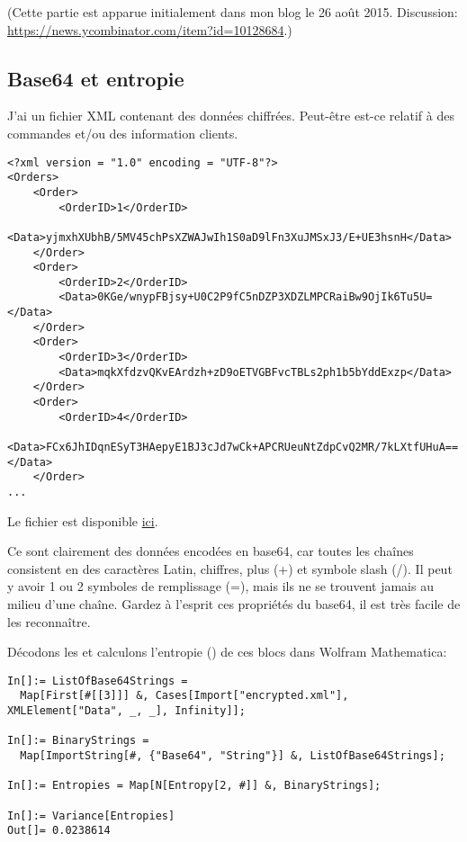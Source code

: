 \label{encrypted_DB1}

(Cette partie est apparue initialement dans mon blog le 26 août 2015.
Discussion: \url{https://news.ycombinator.com/item?id=10128684}.)

\subsection{Base64 et entropie}

J'ai un fichier \ac{XML} contenant des données chiffrées.
Peut-être est-ce relatif à des commandes et/ou des information clients.

\begin{lstlisting}
<?xml version = "1.0" encoding = "UTF-8"?>
<Orders>
	<Order>
		<OrderID>1</OrderID>
		<Data>yjmxhXUbhB/5MV45chPsXZWAJwIh1S0aD9lFn3XuJMSxJ3/E+UE3hsnH</Data>
	</Order>
	<Order>
		<OrderID>2</OrderID>
		<Data>0KGe/wnypFBjsy+U0C2P9fC5nDZP3XDZLMPCRaiBw9OjIk6Tu5U=</Data>
	</Order>
	<Order>
		<OrderID>3</OrderID>
		<Data>mqkXfdzvQKvEArdzh+zD9oETVGBFvcTBLs2ph1b5bYddExzp</Data>
	</Order>
	<Order>
		<OrderID>4</OrderID>
		<Data>FCx6JhIDqnESyT3HAepyE1BJ3cJd7wCk+APCRUeuNtZdpCvQ2MR/7kLXtfUHuA==</Data>
	</Order>
...
\end{lstlisting}

Le fichier est disponible \href{\RepoURL/examples/encrypted_DB1/encrypted.xml}{ici}.

Ce sont clairement des données encodées en base64, car toutes les chaînes consistent
en des caractères Latin, chiffres, plus (+) et symbole slash (/).
Il peut y avoir 1 ou 2 symboles de remplissage (=), mais ils ne se trouvent jamais
au milieu d'une chaîne.
Gardez à l'esprit ces propriétés du base64, il est très facile de les reconnaître.

Décodons les et calculons l'entropie () de ces blocs dans Wolfram Mathematica:

\begin{lstlisting}
In[]:= ListOfBase64Strings =
  Map[First[#[[3]]] &, Cases[Import["encrypted.xml"], XMLElement["Data", _, _], Infinity]];

In[]:= BinaryStrings =
  Map[ImportString[#, {"Base64", "String"}] &, ListOfBase64Strings];

In[]:= Entropies = Map[N[Entropy[2, #]] &, BinaryStrings];

In[]:= Variance[Entropies]
Out[]= 0.0238614
\end{lstlisting}

